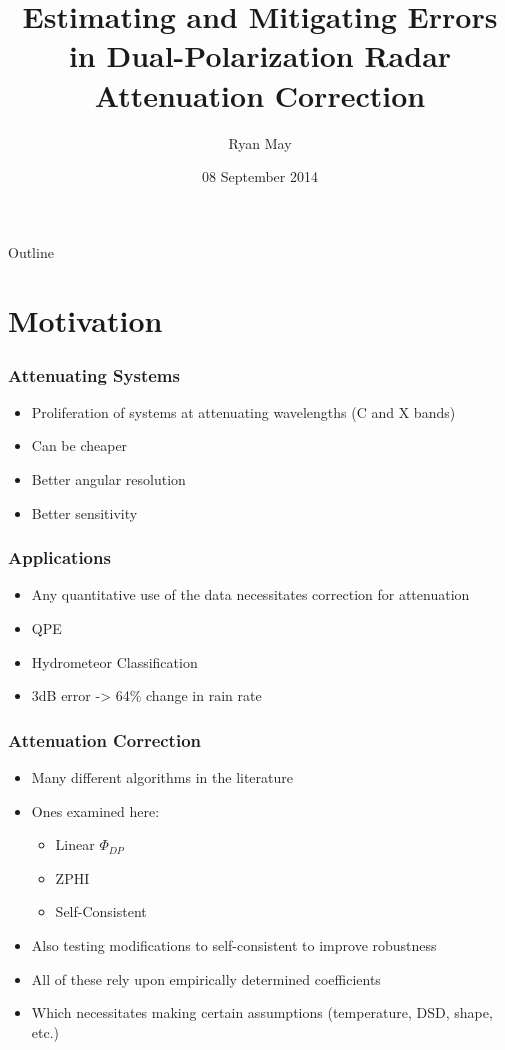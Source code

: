 \documentclass[red]{beamer}
\title{Estimating and Mitigating Errors in Dual-Polarization Radar Attenuation Correction}
\author{Ryan May}
\date{08 September 2014}
\begin{document}
\begin{frame}
	\titlepage
\end{frame}

\begin{frame}{Outline}
    \tableofcontents
\end{frame}

\section{Motivation}
\begin{frame}[<+->]
	\frametitle{Attenuating Systems}
	\begin{itemize}
		\item Proliferation of systems at attenuating wavelengths (C and X bands)
		\item Can be cheaper
		\item Better angular resolution
		\item Better sensitivity
	\end{itemize}
\end{frame}

\begin{frame}
	\frametitle{Applications}
	\begin{itemize}[<+->]
		\item Any quantitative use of the data necessitates correction for attenuation
		\item QPE
		\item Hydrometeor Classification
		\item 3dB error -> 64\% change in rain rate
	\end{itemize}
\end{frame}

\begin{frame}
	\frametitle{Attenuation Correction}
	\begin{itemize}[<+->]
		\item Many different algorithms in the literature
		\item Ones examined here:
		\begin{itemize}
			\item Linear $\Phi_{DP}$
			\item ZPHI
			\item Self-Consistent
		\end{itemize}
		\item Also testing modifications to self-consistent to improve robustness
		\item All of these rely upon empirically determined coefficients
		\item Which necessitates making certain assumptions (temperature,
		DSD, shape, etc.)
	\end{itemize}
\end{frame}
\end{document}
